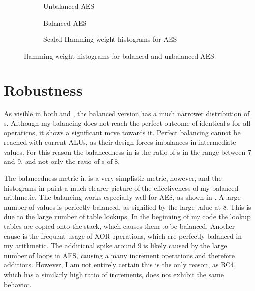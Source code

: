 \begin{figure}[hp]
  \centering
  \begin{subfigure}[b]{0.49\textwidth}
    
    \caption{Unbalanced AES}
  \end{subfigure}
  \begin{subfigure}[b]{0.49\textwidth}
    
    \caption{Balanced AES}
    \label{fig:aes-balanced}
  \end{subfigure}

  \begin{subfigure}[b]{\textwidth}
    
    \caption{Scaled Hamming weight histograms for AES}
    \label{fig:aes-comp}
  \end{subfigure}
  \caption{Hamming weight histograms for balanced and unbalanced AES}
  \label{fig:aes}
\end{figure}

\section{Robustness}
As visible in both  and , the balanced version has a much narrower distribution of \hammingw{}s.
Although my balancing does not reach the perfect outcome of identical \hammingw{}s for all operations, it shows a significant move towards it.
Perfect balancing cannot be reached with current ALUs, as their design forces imbalances in intermediate values.
For this reason the balancedness in  is the ratio of \hammingw{}s in the range between 7 and 9, and not only the ratio of \hammingw{}s of 8.

The balancedness metric in  is a very simplistic metric, however, and the histograms in  paint a much clearer picture of the effectiveness of my balanced arithmetic.
The balancing works especially well for AES, as shown in .
A large number of values is perfectly balanced, as signified by the large value at 8.
This is due to the large number of table lookups.
In the beginning of my code the lookup tables are copied onto the stack, which causes them to be balanced.
Another cause is the frequent usage of XOR operations, which are perfectly balanced in my arithmetic.
The additional spike around 9 is likely caused by the large number of loops in AES, causing a many increment operations and therefore additions.
However, I am not entirely certain this is the only reason, as RC4, which has a similarly high ratio of increments, does not exhibit the same behavior.

